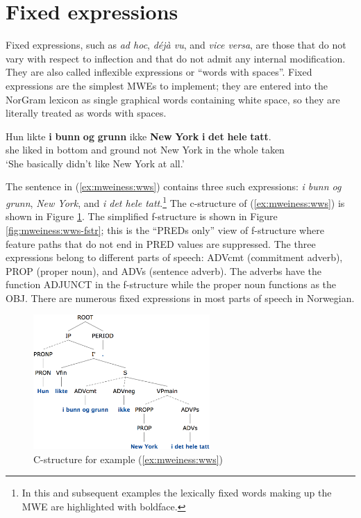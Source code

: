 \documentclass[output=paper]{langsci/langscibook}
\begin{document}
 \section{Fixed expressions}\label{sec:mweiness:fixed}

Fixed expressions, such as \textit{ad hoc}, \textit{déjà vu}, and \textit{vice versa}, are those that do not vary with respect to inflection and that do not admit any internal modification.
They are also called inflexible expressions or ``words with spaces''.
Fixed expressions are the simplest MWEs to implement; they are entered into the NorGram lexicon as single graphical words containing white space, so they are literally treated as words with spaces.

\ea\label{ex:mweiness:wws}
\gll Hun likte \textbf{i} \textbf{bunn} \textbf{og} \textbf{grunn} ikke \textbf{New} \textbf{York} \textbf{i} \textbf{det} \textbf{hele} \textbf{tatt}. \\
     she liked in bottom and ground not New York in the whole taken\\
\glt `She basically didn’t like New York at all.’
\z

The sentence in (\ref{ex:mweiness:wws}) contains three such expressions: \textit{i bunn og grunn}, \textit{New York}, and \textit{i det hele tatt}.\footnote{In this and subsequent examples the lexically fixed words making up the MWE are highlighted with boldface.}
The c-structure of (\ref{ex:mweiness:wws}) is shown in Figure \ref{fig:mweiness:wws-cstr}.
The simplified f-structure is shown in Figure \ref{fig:mweiness:wws-fstr}; this is the ``PREDs only'' view of f-structure where feature paths that do not end in PRED values are suppressed. 
The three expressions belong to different parts of speech: ADVcmt (commitment adverb), PROP (proper noun), and ADVs (sentence adverb).
The adverbs have the function ADJUNCT in the f-structure while the proper noun functions as the OBJ.
There are numerous fixed expressions in most parts of speech in Norwegian.

%
\begin{figure}
  \includegraphics[width=0.6\textwidth]{figures/wws-cstr}
  \caption{C-structure for example (\ref{ex:mweiness:wws})}
  \label{fig:mweiness:wws-cstr}
\end{figure}
\end{document}
